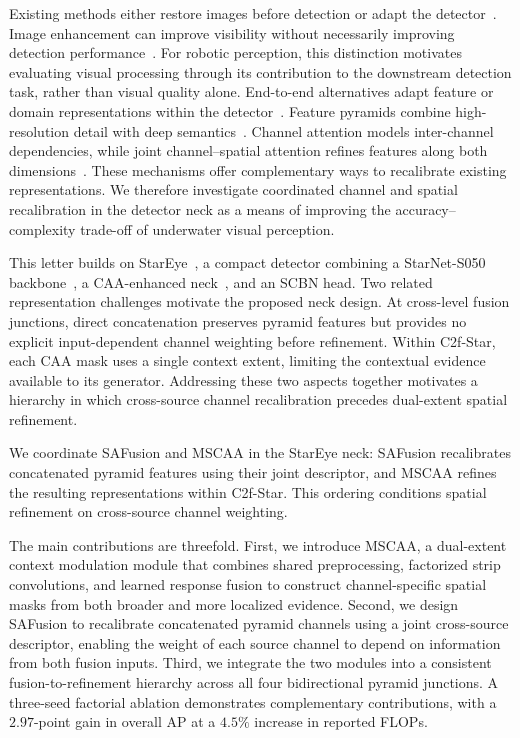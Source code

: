 \documentclass[letterpaper,10pt,conference]{ieeeconf}
\begin{document}
Existing methods either restore images before detection or adapt the
detector~\cite{ref_survey,ref_swipenet,ref_amspuod}.
Image enhancement can improve visibility without necessarily improving
detection performance~\cite{ref_uieb,ref_enhance1,ref_enhance2}.
For robotic perception, this distinction motivates evaluating visual
processing through its contribution to the downstream detection task,
rather than visual quality alone.
End-to-end alternatives adapt feature or domain representations
within the detector~\cite{ref_e2e1,ref_e2e2}.
Feature pyramids combine high-resolution detail with deep
semantics~\cite{ref_fpn,ref_panet,ref_efficientdet}.
Channel attention models inter-channel dependencies, while joint
channel--spatial attention refines features along both
dimensions~\cite{ref_senet,ref_cbam}.
These mechanisms offer complementary ways to recalibrate existing
representations. We therefore investigate coordinated channel and
spatial recalibration in the detector neck as a means of improving
the accuracy--complexity trade-off of underwater visual perception.

This letter builds on StarEye~\cite{ref_stareye}, a compact detector
combining a StarNet-S050 backbone~\cite{ref_starnet}, a CAA-enhanced
neck~\cite{ref_caa}, and an SCBN head. Two related representation challenges motivate the proposed neck design. At cross-level fusion junctions, direct concatenation preserves pyramid features but provides no explicit input-dependent channel weighting before refinement. Within C2f-Star, each CAA mask uses a single context extent, limiting the contextual evidence available to its generator. Addressing these two aspects together motivates a hierarchy in which cross-source channel recalibration precedes dual-extent spatial refinement.

We coordinate SAFusion and MSCAA in the StarEye neck: SAFusion recalibrates
concatenated pyramid features using their joint descriptor, and MSCAA refines
the resulting representations within C2f-Star. This ordering conditions
spatial refinement on cross-source channel weighting.

The main contributions are threefold. First, we introduce MSCAA, a dual-extent context modulation module that combines shared preprocessing, factorized strip convolutions, and learned response fusion to construct channel-specific spatial masks from both broader and more localized evidence. Second, we design SAFusion to recalibrate concatenated pyramid channels using a joint cross-source descriptor, enabling the weight of each source channel to depend on information from both fusion inputs. Third, we integrate the two modules into a consistent fusion-to-refinement hierarchy across all four bidirectional pyramid junctions. A three-seed factorial ablation demonstrates complementary contributions, with a \(2.97\)-point gain in overall AP at a \(4.5\%\) increase in reported FLOPs.
\end{document}
